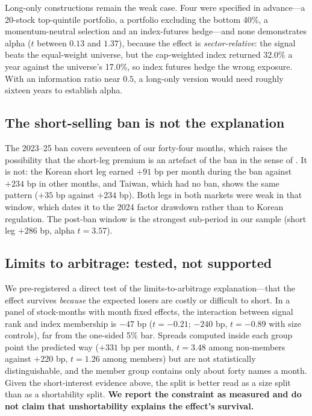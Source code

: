 \documentclass[12pt,a4paper]{article}
\begin{document}
Long-only constructions remain the weak case. Four were specified in advance---a 20-stock top-quintile portfolio, a
portfolio excluding the bottom 40\%, a momentum-neutral selection and an index-futures hedge---and none demonstrates
alpha ($t$ between $0.13$ and $1.37$), because the effect is \emph{sector-relative}: the signal beats the equal-weight
universe, but the cap-weighted index returned 32.0\% a year against the universe's 17.0\%, so index futures hedge the
wrong exposure. With an information ratio near $0.5$, a long-only version would need roughly sixteen years to establish
alpha.

\subsection{The short-selling ban is not the explanation}\label{sec:ban}

The 2023--25 ban covers seventeen of our forty-four months, which raises the possibility that the short-leg premium is
an artefact of the ban in the sense of \citet{miller1977}. It is not: the Korean short leg earned $+91$ bp per month
during the ban against $+234$ bp in other months, and Taiwan, which had no ban, shows the same pattern ($+35$ bp against
$+234$ bp). Both legs in both markets were weak in that window, which dates it to the 2024 factor drawdown rather than
to Korean regulation. The post-ban window is the strongest sub-period in our sample (short leg $+286$ bp, alpha
$t=3.57$).

\subsection{Limits to arbitrage: tested, not supported}\label{sec:loa}

We pre-registered a direct test of the limits-to-arbitrage explanation---that the effect survives \emph{because} the
expected losers are costly or difficult to short. In a panel of stock-months with month fixed effects, the interaction between signal rank and
index membership is $-47$ bp ($t=-0.21$; $-240$ bp, $t=-0.89$ with size controls), far from the one-sided 5\% bar.
Spreads computed inside each group point the predicted way ($+331$ bp per month, $t=3.48$ among non-members against
$+220$ bp, $t=1.26$ among members) but are not statistically distinguishable, and the member group contains only about
forty names a month. Given the short-interest evidence above, the split is better read as a size split than as a
shortability split. \textbf{We report the constraint as measured and do not claim that unshortability explains the
effect's survival.}
\end{document}
